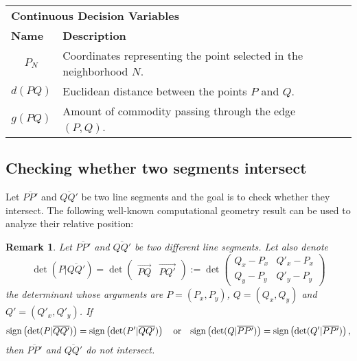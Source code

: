 \documentclass[a4paper]{elsarticle}
\newtheorem{remark}{Remark}
\begin{document}
{\begin{table}[h!]
\begin{tabular}{|cl|l}
\multicolumn{2}{|l|}{\textbf{Continuous Decision Variables}} & \multicolumn{1}{c}{\textbf{}} \\ \cline{1-2}
\multicolumn{1}{|l|}{\textbf{Name}} & \textbf{Description} &  \\ \cline{1-2}
\multicolumn{1}{|c|}{$P_N$} & Coordinates representing the point selected in the neighborhood $N$. &  \\ \cline{1-2}
\multicolumn{1}{|c|}{$d(PQ)$} & Euclidean distance between the points $P$ and $Q$. &  \\ \cline{1-2}
\multicolumn{1}{|c|}{$g(PQ)$} & Amount of commodity passing through the edge $(P, Q)$. &  \\ \cline{1-2}
\end{tabular}
\end{table}
}

\subsection{Checking whether two segments intersect}
Let $\overline{PP'}$ and $\overline{QQ'}$ be two line segments and the goal is to check whether they intersect. The following well-known computational geometry result can be used to analyze their relative position:

\newcommand{\segment}[2]{\overline{#1#2}}
\newcommand{\determinant}[3]{\det({#1|\overline{#2#3}})}


\begin{remark}\label{rem:determinants}
Let $\overline{PP'}$ and $\overline{QQ'}$ be two different line segments. Let also denote 
$$
\determinant{P}{Q}{Q'}=\det\left(\begin{array}{c|c} \overrightarrow{PQ} & \overrightarrow{PQ'}\end{array}\right):=\det\left( \begin{array}{cc}  Q_x-P_x & Q'_x-P_x \\ Q_y-P_y & Q'_y-P_y \end{array}\right)$$ 
the determinant whose arguments are $P=(P_x,P_y)$, $Q=(Q_x,Q_y)$ and $Q'=(Q'_x,Q'_y)$. If
\begin{equation*}
\normalfont{\text{sign}}\left(\determinant{P}{Q}{Q'}\right) = \normalfont{\text{sign}}\left(\determinant{P'}{Q}{Q'}\right)
\quad
\text{or}
\quad
\normalfont{\text{sign}}\left(\determinant{Q}{P}{P'}\right) = \normalfont{\text{sign}}\left(\determinant{Q'}{P}{P'}\right)
,
\end{equation*}
then $\overline{PP'}$ and $\overline{QQ'}$ do not intersect.
\end{remark}
\end{document}
